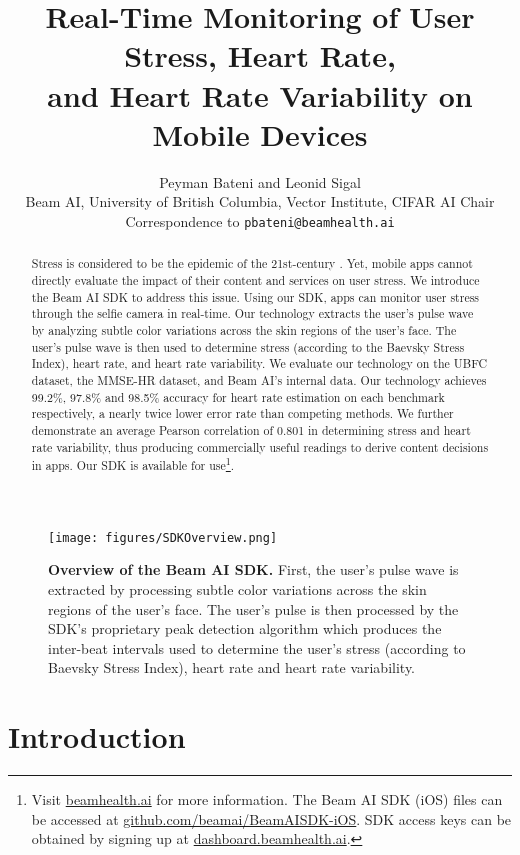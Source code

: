 \documentclass{article}
\title{Real-Time Monitoring of User Stress, Heart Rate, \\ and Heart Rate Variability on Mobile Devices}
\author{Peyman Bateni and Leonid Sigal \\
  Beam AI, University of British Columbia, Vector Institute, CIFAR AI Chair  \\
  Correspondence to \texttt{pbateni@beamhealth.ai} \\
}
\begin{document}
\maketitle

\vspace{-0.15in}
\begin{abstract}
Stress is considered to be the epidemic of the 21st-century \cite{Fink2016_StressEpidemic}. Yet, mobile apps cannot directly evaluate the impact of their content and services on user stress. We introduce the Beam AI SDK to address this issue. Using our SDK, apps can monitor user stress through the selfie camera in real-time. Our technology extracts the user’s pulse wave by analyzing subtle color variations across the skin regions of the user’s face. The user’s pulse wave is then used to determine stress (according to the Baevsky Stress Index), heart rate, and heart rate variability. We evaluate our technology on the UBFC dataset, the MMSE-HR dataset, and Beam AI's internal data. Our technology achieves 99.2\%, 97.8\% and 98.5\% accuracy for heart rate estimation on each benchmark respectively, a nearly twice lower error rate than competing methods. We further demonstrate an average Pearson correlation of 0.801 in determining stress and heart rate variability, thus producing commercially useful readings to derive content decisions in apps. Our SDK is available for use\footnote{Visit \url{beamhealth.ai} for more information. The Beam AI SDK (iOS) files can be accessed at \url{github.com/beamai/BeamAISDK-iOS}. SDK access keys can be obtained by signing up at \url{dashboard.beamhealth.ai}.}.
\end{abstract}

\begin{figure}[!b]
    \centering
    \texttt{[image: figures/SDKOverview.png]}
    \caption{{\bf Overview of the Beam AI SDK.} First, the user’s pulse wave is extracted by processing subtle color variations across the skin regions of the user’s face. The user’s pulse is then processed by the SDK's proprietary peak detection algorithm which produces the inter-beat intervals used to determine the user's stress (according to Baevsky Stress Index), heart rate and heart rate variability.}
    \label{fig:sdk-overview}
\end{figure}

\section{Introduction}
\end{document}
